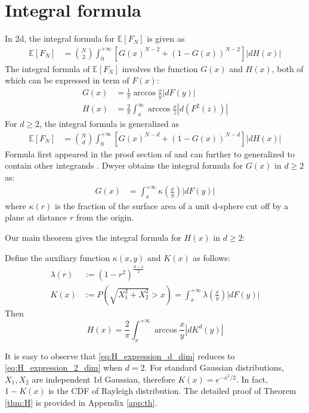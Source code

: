 \documentclass{aptpub}
\def\E{\mathbb{E}}
\begin{document}
\section{Integral formula}\label{sec:int_f}
In 2d, the integral formula for $\E[F_N]$ is given as
\begin{align}
     \E[F_N] &= \binom{N}{2} \int_0^{+\infty} 
     \left[G(x)^{N-2} + (1-G(x))^{N-2} \right]|dH(x)| 
     \label{eq:E_F_N_2_d}
\end{align}
The integral formula of $\E[F_N]$ involves the function $G(x)$ and $H(x)$,
both of which can be expressed in term of $F(x)$:
\begin{align}
   G(x) &=\frac{1}{\pi} \arccos\frac{x}{y} |dF(y)| \\
     H(x) &= \frac{2}{\pi} \int_x^{\infty} \arccos \frac{x}{z} |d(F^2(z))|
     \label{eq:H_expression_2_dim}
\end{align}
For $d\geq 2$, the integral formula is generalized as
\begin{align}
     \E[F_N] &= \binom{N}{d} \int_0^{+\infty} 
     \left[G(x)^{N-d} + (1-G(x))^{N-d} \right]|dH(x)| 
     \label{eq:E_F_N_d}
\end{align}
Formula first appeared in the proof section of \cite{raynaud1970enveloppe}
and can further to generalized to contain other integrands \cite{barany2008random}.
Dwyer obtains the integral formula for $G(x)$ in $d\geq 2$ as:
\begin{align}\label{eq:G_d_kappa}
     G(x) & = \int_x^{+\infty} \kappa(\frac{x}{y}) |dF(y)|
\end{align}
where $\kappa(r)$ is the fraction of the surface area of a unit d-sphere
cut off by a plane at distance $r$ from the origin.

Our main theorem gives the integral formula for $H(x)$ in $d\geq 2$:
\begin{theorem}\label{thm:H}
Define the auxiliary function $\kappa(x,y)$ and $K(x)$ as follows: 
     \begin{align}
          \lambda(r) & :=(1-r^2)^{\frac{d-2}{2}}
          \label{eq:lambda_r}\\
          K(x) &:=P(\sqrt{X_1^2+X_2^2}>x)=
          \int_x^{+\infty}
          \lambda \left(\frac{x}{y} \right)|dF(y)|
          \label{eq:K_x}
      \end{align}
Then
\begin{equation}
     H(x) = \frac{2}{\pi}
     \int_x^{+\infty} \arccos\frac{x}{y}
     |d K^d(y)|\label{eq:H_expression_d_dim}
\end{equation}
\end{theorem}
It is easy to observe that \eqref{eq:H_expression_d_dim} reduces to 
\eqref{eq:H_expression_2_dim} when $d=2$.
For standard Gaussian distributions, $X_1, X_2$ are independent 1d
Gaussian, therefore $K(x) = e^{-x^2/2}$. In fact, $1-K(x)$ is the CDF of Rayleigh distribution.
The detailed proof of Theorem \ref{thm:H}
is provided in Appendix \ref{app:th}.
\end{document}
